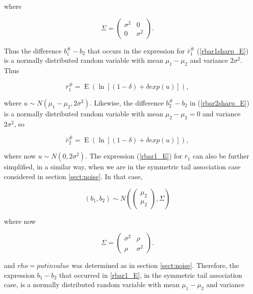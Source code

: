 \documentclass[letterpaper,11pt]{article}
\DeclareMathOperator{\EX}{E}%
\begin{document}
\noindent where

\begin{equation}
\Sigma = \begin{pmatrix} \sigma^2&0\\0&\sigma^2\end{pmatrix}. \label{Sigmamat_cov0}
\end{equation}

\noindent Thus the difference $b_1^\#-b_2$ that occurs in the expression for $\bar r_1^\#$ (\ref{rbar1sharp_E}) is a normally distributed random variable with mean $\mu_1-\mu_2$ and variance $2\sigma^2$. Thus

\begin{equation}
\bar r_1^\#=\EX(\ln [(1-\delta)+\delta exp(u)]),  \label{rbar1sharp_E_usub}
\end{equation}

\noindent where $u \sim N(\mu_1-\mu_2,2\sigma^2)$. Likewise, the difference $b_2^\#-b_2$ in (\ref{rbar2sharp_E}) is a normally distributed random variable with mean $\mu_2-\mu_2=0$ and variance $2\sigma^2$, so

\begin{equation}
\bar r_2^\#=\EX(\ln [(1-\delta)+\delta exp(u)]),  \label{rbar2sharp_E_usub}
\end{equation}

\noindent where now $u \sim N(0,2\sigma^2)$. The expression (\ref{rbar1_E}) for $\bar r_1$ can also be further simplified, in a similar way, when we are in the symmetric tail association case considered in section \ref{sect:noise}. In that case,

\begin{equation}
(b_1,b_2) \sim  N(\begin{pmatrix} \mu_2\\\mu_2\end{pmatrix}, \Sigma) \label{b1b2_distribution_sym}
\end{equation}

\noindent where now

\begin{equation}
\Sigma = \begin{pmatrix} \sigma^2&\rho\\\rho&\sigma^2\end{pmatrix}. \label{Sigmamat_rho}
\end{equation}

\noindent and $rho=put in value$ was determined as in section \ref{sect:noise}. Therefore, the expression $b_1-b_2$ that occurred in \ref{rbar1_E}, in the symmetric tail association case, is a normally distributed random variable with mean $\mu_1-\mu_2$ and variance
\end{document}
